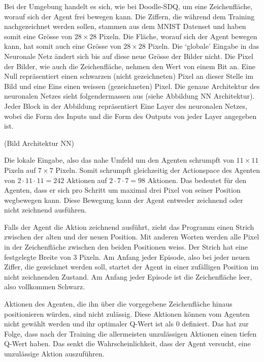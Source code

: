 Bei der Umgebung handelt es sich, wie bei Doodle-SDQ, um eine Zeichenfläche,
worauf sich der Agent frei bewegen kann. Die Ziffern, die während dem Training
nachgezeichnet werden sollen, stammen aus dem MNIST Datenset und haben somit
eine Grösse von $28\times28$ Pixeln. Die Fläche, worauf sich der Agent bewegen   
kann, hat somit auch eine Grösse von $28\times28$ Pixeln. Die `globale' Eingabe
in das Neuronale Netz ändert sich bis auf diese neue Grösse der Bilder nicht.
Die Pixel der Bilder, wie auch die Zeichenfläche, nehmen den Wert von einem Bit
an. Eine Null repräsentiert einen schwarzen (nicht gezeichneten) Pixel an dieser
Stelle im Bild und eine Eins einen weissen (gezeichneten) Pixel. Die genaue
Architektur des neuronalen Netzes sieht folgendermassen aus (siehe Abbildung NN
Architektur). Jeder Block in der Abbildung repräsentiert Eine Layer des
neuronalen Netzes, wobei die Form des Inputs und die Form des Outputs von jeder
Layer angegeben ist. 

(Bild Architektur NN) %



Die lokale Eingabe, also das nahe Umfeld um den Agenten schrumpft von
$11\times11$ Pixeln auf $7\times7$ Pixeln. Somit schrumpft gleichzeitig der
Actionspace des Agenten von $2\cdot11\cdot11 = 242$ Aktionen auf $2\cdot7\cdot7
= 98$ Aktionen. Das bedeutet für den Agenten, dass er sich pro Schritt um
maximal drei Pixel von seiner Position wegbewegen kann. Diese Bewegung
kann der Agent entweder zeichnend oder nicht zeichnend
ausführen.

Falls der Agent die Aktion zeichnend ausführt, zieht das Programm einen Strich
zwischen der alten und der neuen Position. Mit anderen Worten werden alle Pixel
in der Zeichenfläche zwischen den beiden Positionen weiss. Der Strich hat eine
festgelegte Breite von $3$ Pixeln. Am Anfang jeder Episode, also bei jeder neuen
Ziffer, die gezeichnet werden soll, startet der Agent in einer zufälligen
Position im nicht zeichnenden Zustand. Am Anfang jeder Episode ist die
Zeichenfläche leer, also vollkommen Schwarz.

Aktionen des Agenten, die ihn über die vorgegebene Zeichenfläche hinaus
positionieren würden, sind nicht zulässig. Diese Aktionen können vom Agenten
nicht gewählt werden und ihr optimaler Q-Wert ist als $0$ definiert. Das hat zur
Folge, dass nach der Training die allermeisten unzulässigen Aktionen einen
tiefen Q-Wert haben. Das senkt die Wahrscheinlichkeit, dass der Agent versucht,
eine unzulässige Aktion auszuführen.

